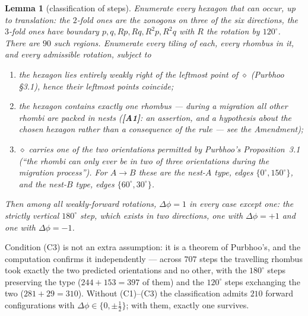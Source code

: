 \documentclass[11pt]{article}
\theoremstyle{plain}
\newtheorem{lemma}[theorem]{Lemma}
\theoremstyle{definition}
\begin{document}
\begin{lemma}[classification of steps]\label{lem:classify}
Enumerate every hexagon that can occur, up to translation: the $2$-fold ones are the
zonogons on three of the six directions, the $3$-fold ones have boundary
$p,q,Rp,Rq,R^2p,R^2q$ with $R$ the rotation by $120^\circ$.  There are $90$ such
regions.  Enumerate every tiling of each, every rhombus in it, and every admissible
rotation, subject to
\begin{enumerate}
\item[(C1)] the hexagon lies entirely weakly right of the leftmost point of
            $\diamond$ (Purbhoo \S3.1), hence their leftmost points coincide;
\item[(C2)] the hexagon contains exactly one rhombus --- during a migration all other
            rhombi are packed in nests (\textbf{[A1]}: an assertion, and a
            hypothesis about the \emph{chosen} hexagon rather than a consequence of
            the rule --- see the Amendment);
\item[(C3)] $\diamond$ carries one of the two orientations permitted by Purbhoo's
            Proposition~3.1 (``the rhombi can only ever be in two of three
            orientations during the migration process'').  For $A\to B$ these are the
            nest-$A$ type, edges $\{0^\circ,150^\circ\}$, and the nest-$B$ type, edges
            $\{60^\circ,30^\circ\}$.
\end{enumerate}
Then among all weakly-forward rotations, $\Delta\phi=1$ in every case except one:
the strictly vertical $180^\circ$ step, which exists in two directions, one with
$\Delta\phi=+1$ and one with $\Delta\phi=-1$.
\end{lemma}

Condition (C3) is not an extra assumption: it is a theorem of Purbhoo's, and the
computation confirms it independently --- across $707$ steps the travelling rhombus
took exactly the two predicted orientations and no other, with the $180^\circ$ steps
preserving the type ($244+153=397$ of them) and the $120^\circ$ steps exchanging the
two ($281+29=310$).  Without (C1)--(C3) the classification admits $210$ forward
configurations with $\Delta\phi\in\{0,\pm\tfrac12\}$; with them, exactly one survives.
\end{document}
